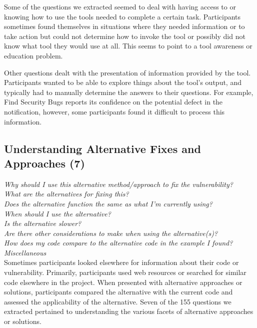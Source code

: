 \documentclass[conference]{IEEEtran}
\begin{document}
Some of the questions we extracted seemed to deal with having access to or knowing how to use the tools needed to complete a certain task. 
Participants sometimes found themselves in situations where they needed information or to take action but could not determine how to invoke the tool or possibly did not know what tool they would use at all. 
This seems to point to a tool awareness or education problem.


Other questions dealt with the presentation of information provided by the tool. 
Participants wanted to be able to explore things about the tool's output, and typically had to manually determine the answers to their questions. 
For example, Find Security Bugs reports its confidence on the potential defect in the notification, however, some participants found it difficult to process this information.




\noindent\subsection{\textbf{Understanding Alternative Fixes and Approaches (7)}}

\noindent\emph{Why should I use this alternative method/approach to fix the vulnerability?} \\
\emph{What are the alternatives for fixing this?} \\
\emph{Does the alternative function the same as what I'm currently using?} \\
\emph{When should I use the alternative?} \\
\emph{Is the alternative slower?} \\
\emph{Are there other considerations to make when using the alternative(s)?} \\
\emph{How does my code compare to the alternative code in the example I found?} \\
\emph{Miscellaneous} \\

Sometimes participants looked elsewhere for information about their code or vulnerability. 
Primarily, participants used web resources or searched for similar code elsewhere in the project.
When presented with alternative approaches or solutions, participants compared the alternative with the current code and assessed the applicability of the alternative. 
Seven of the 155 questions we extracted pertained to understanding the various facets of alternative approaches or solutions.
\end{document}
